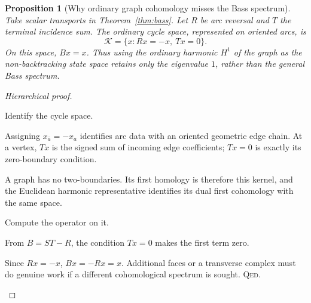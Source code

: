 \documentclass[11pt,a4paper]{article}
\newtheorem{proposition}[definition]{Proposition}
\theoremstyle{remark}\newtheorem{remark}[definition]{Remark}
\newcommand{\QED}{\textsc{Qed}}
\begin{document}
\begin{proposition}[Why ordinary graph cohomology misses the Bass spectrum]\label{prop:graph-harmonic}
Take scalar transports in Theorem~\ref{thm:bass}. Let $R$ be arc reversal and $T$ the terminal incidence sum. The ordinary cycle space, represented on oriented arcs, is
\[
\mathcal K=\{x:Rx=-x,\ Tx=0\}.
\]
On this space, $Bx=x$. Thus using the ordinary harmonic $H^1$ of the graph as the non-backtracking state space retains only the eigenvalue $1$, rather than the general Bass spectrum.
\end{proposition}
\begin{proof}[Hierarchical proof]
\begin{steps}
\item Identify the cycle space.
\begin{steps}
\item Assigning $x_{\bar a}=-x_a$ identifies arc data with an oriented geometric edge chain. At a vertex, $Tx$ is the signed sum of incoming edge coefficients; $Tx=0$ is exactly its zero-boundary condition.
\item A graph has no two-boundaries. Its first homology is therefore this kernel, and the Euclidean harmonic representative identifies its dual first cohomology with the same space.
\end{steps}
\item Compute the operator on it.
\begin{steps}
\item From $B=ST-R$, the condition $Tx=0$ makes the first term zero.
\item Since $Rx=-x$, $Bx=-Rx=x$. Additional faces or a transverse complex must do genuine work if a different cohomological spectrum is sought. \QED.
\end{steps}
\end{steps}
\end{proof}
\end{document}
